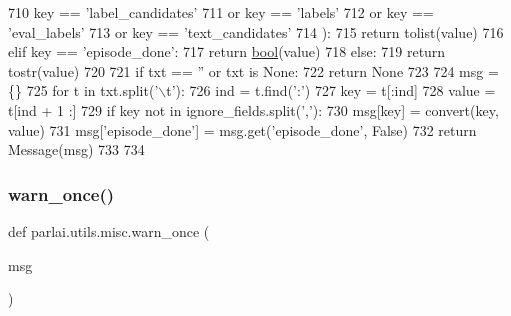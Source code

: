 \begin{DoxyCode}
710             key == \textcolor{stringliteral}{'label\_candidates'}
711             \textcolor{keywordflow}{or} key == \textcolor{stringliteral}{'labels'}
712             \textcolor{keywordflow}{or} key == \textcolor{stringliteral}{'eval\_labels'}
713             \textcolor{keywordflow}{or} key == \textcolor{stringliteral}{'text\_candidates'}
714         ):
715             \textcolor{keywordflow}{return} tolist(value)
716         \textcolor{keywordflow}{elif} key == \textcolor{stringliteral}{'episode\_done'}:
717             \textcolor{keywordflow}{return} \hyperlink{namespaceprojects_1_1mastering__the__dungeon_1_1mturk_1_1tasks_1_1MTD_1_1run_a6fc0c9b519a36f82b65bcd398f1fbb9d}{bool}(value)
718         \textcolor{keywordflow}{else}:
719             \textcolor{keywordflow}{return} tostr(value)
720 
721     \textcolor{keywordflow}{if} txt == \textcolor{stringliteral}{''} \textcolor{keywordflow}{or} txt \textcolor{keywordflow}{is} \textcolor{keywordtype}{None}:
722         \textcolor{keywordflow}{return} \textcolor{keywordtype}{None}
723 
724     msg = \{\}
725     \textcolor{keywordflow}{for} t \textcolor{keywordflow}{in} txt.split(\textcolor{stringliteral}{'\(\backslash\)t'}):
726         ind = t.find(\textcolor{stringliteral}{':'})
727         key = t[:ind]
728         value = t[ind + 1 :]
729         \textcolor{keywordflow}{if} key \textcolor{keywordflow}{not} \textcolor{keywordflow}{in} ignore\_fields.split(\textcolor{stringliteral}{','}):
730             msg[key] = convert(key, value)
731     msg[\textcolor{stringliteral}{'episode\_done'}] = msg.get(\textcolor{stringliteral}{'episode\_done'}, \textcolor{keyword}{False})
732     \textcolor{keywordflow}{return} Message(msg)
733 
734 
\end{DoxyCode}
\mbox{\label{namespaceparlai_1_1utils_1_1misc_a884a3aefa90581f53bc592fa6a78dc43}} 
\subsubsection{\texorpdfstring{warn\+\_\+once()}{warn\_once()}}
{\footnotesize\ttfamily def parlai.\+utils.\+misc.\+warn\+\_\+once (\begin{DoxyParamCaption}\item[{}]{msg }\end{DoxyParamCaption})}



